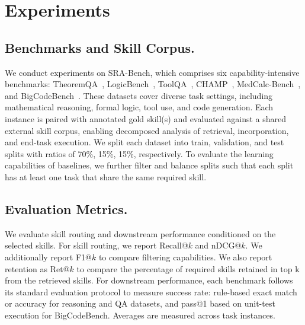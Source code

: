 
\section{Experiments}

\subsection{Benchmarks and Skill Corpus.}

We conduct experiments on SRA-Bench, which comprises six capability-intensive benchmarks: TheoremQA~\citep{chen-etal-2023-theoremqa}, LogicBench~\citep{parmar-etal-2024-logicbench}, ToolQA~\citep{NEURIPS2023_9cb2a749}, CHAMP~\citep{mao-etal-2024-champ}, MedCalc-Bench~\citep{NEURIPS2024_99e81750}, and BigCodeBench~\citep{ICLR2025_a6a90bcc}. These datasets cover diverse task settings, including mathematical reasoning, formal logic, tool use, and code generation. Each instance is paired with annotated gold skill(s) and evaluated against a shared external skill corpus, enabling decomposed analysis of retrieval, incorporation, and end-task execution. We split each dataset into train, validation, and test splits with ratios of 70\%, 15\%, 15\%, respectively. To evaluate the learning capabilities of baselines, we further filter and balance splits such that each split has at least one task that share the same required skill.

\subsection{Evaluation Metrics.}

We evaluate skill routing and downstream performance conditioned on the selected skills. For skill routing, we report Recall@\(k\) and nDCG@\(k\). We additionally report F1@\(k\) to compare filtering capabilities. We also report retention as Ret@\(k\) to compare the percentage of required skills retained in top k from the retrieved skills. For downstream performance, each benchmark follows its standard evaluation protocol to measure success rate: rule-based exact match or accuracy for reasoning and QA datasets, and pass@1 based on unit-test execution for BigCodeBench. Averages are measured across task instances.

